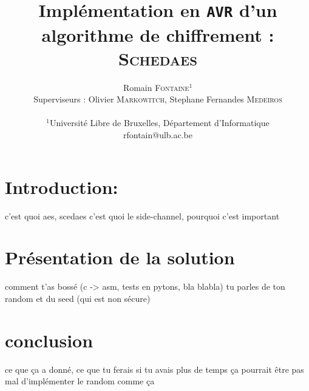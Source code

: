 \documentclass[letterpaper]{article}
\author{Romain \textsc{Fontaine}$^{1}$\\
    Superviseurs : Olivier \textsc{Markowitch}, Stephane Fernandes \textsc{Medeiros}\\
    \mbox{}\\
    $^1$Université Libre de Bruxelles, Département d’Informatique \\
    rfontain@ulb.ac.be
}
\title{Implémentation en \texttt{AVR} d'un algorithme de chiffrement :\\ \textsc{Schedaes}}
\date{}
\begin{document}
\maketitle

\section{Introduction:}
c'est quoi aes, scedaes
c'est quoi le side-channel, pourquoi c'est important

\section{Présentation de la solution}
comment t'as bossé (c -> asm, tests en pytons, bla blabla)
tu parles de ton random et du seed (qui est non sécure)

\section{conclusion}
ce que ça a donné, ce que tu ferais si tu avais plus de temps
ça pourrait être pas mal d'implémenter le random comme ça
\end{document}
